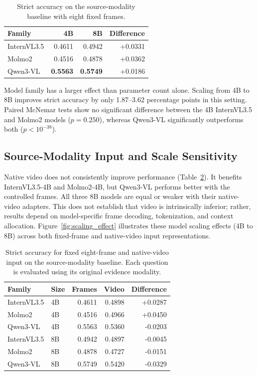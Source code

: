 \begin{table}[ht]
    \centering
    \caption{Strict accuracy on the source-modality baseline with eight fixed frames.}
    \label{tab:matched_results}
    \begin{tabular}{lrrr}
        \toprule
        \textbf{Family} & \textbf{4B} & \textbf{8B} & \textbf{Difference} \\
        \midrule
        InternVL3.5 & 0.4611 & 0.4942 & +0.0331 \\
        Molmo2      & 0.4516 & 0.4878 & +0.0362 \\
        Qwen3-VL    & \textbf{0.5563} & \textbf{0.5749} & +0.0186 \\
        \bottomrule
    \end{tabular}
\end{table}

Model family has a larger effect than parameter count alone. Scaling from 4B
to 8B improves strict accuracy by only 1.87--3.62 percentage points in this
setting. Paired McNemar tests show no significant difference between the 4B
InternVL3.5 and Molmo2 models ($p=0.250$), whereas Qwen3-VL significantly
outperforms both ($p<10^{-38}$).


\subsection{Source-Modality Input and Scale Sensitivity}

Native video does not consistently improve performance
(Table~\ref{tab:input_comparison}). It benefits InternVL3.5-4B and Molmo2-4B,
but Qwen3-VL performs better with the controlled frames. All three 8B models
are equal or weaker with their native-video adapters. This does not establish
that video is intrinsically inferior; rather, results depend on model-specific
frame decoding, tokenization, and context allocation. Figure~\ref{fig:scaling_effect}
illustrates these model scaling effects (4B to 8B) across both fixed-frame and
native-video input representations.

\begin{table}[ht]
    \centering
    \caption{Strict accuracy for fixed eight-frame and native-video input on
    the source-modality baseline. Each question is evaluated using its
    original evidence modality.}
    \label{tab:input_comparison}
    \begin{tabular}{llrrr}
        \toprule
        \textbf{Family} & \textbf{Size} & \textbf{Frames} &
        \textbf{Video} & \textbf{Difference} \\
        \midrule
        InternVL3.5 & 4B & 0.4611 & 0.4898 & +0.0287 \\
        Molmo2      & 4B & 0.4516 & 0.4966 & +0.0450 \\
        Qwen3-VL    & 4B & 0.5563 & 0.5360 & -0.0203 \\
        InternVL3.5 & 8B & 0.4942 & 0.4897 & -0.0045 \\
        Molmo2      & 8B & 0.4878 & 0.4727 & -0.0151 \\
        Qwen3-VL    & 8B & 0.5749 & 0.5420 & -0.0329 \\
        \bottomrule
    \end{tabular}
\end{table}

